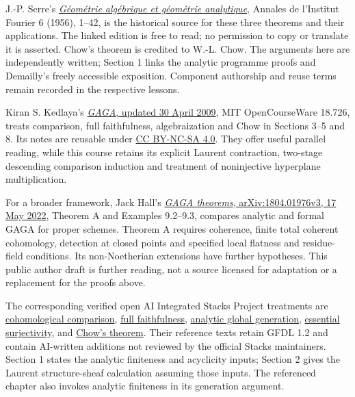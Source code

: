 \documentclass[11pt]{article}
\begin{document}
J.-P. Serre's
\href{https://www.numdam.org/item/AIF_1956__6__1_0/}{\emph{Géométrie
algébrique et géométrie analytique}}, Annales de l'Institut Fourier 6
(1956), 1--42, is the historical source for these three theorems and
their applications. The linked edition is free to read; no permission to
copy or translate it is asserted. Chow's theorem is credited to W.-L.
Chow. The arguments here are independently written; Section 1 links the
analytic programme proofs and Demailly's freely accessible exposition.
Component authorship and reuse terms remain recorded in the respective
lessons.

Kiran S. Kedlaya's
\href{https://ocw.mit.edu/courses/18-726-algebraic-geometry-spring-2009/resources/mit18_726s09_lec22_gaga/}{\emph{GAGA},
updated 30 April 2009}, MIT OpenCourseWare 18.726, treats comparison,
full faithfulness, algebraization and Chow in Sections 3--5 and 8. Its
notes are reusable under
\href{https://ocw.mit.edu/pages/privacy-and-terms-of-use/}{CC BY-NC-SA
4.0}. They offer useful parallel reading, while this course retains its
explicit Laurent contraction, two-stage descending comparison induction
and treatment of noninjective hyperplane multiplication.

For a broader framework, Jack Hall's
\href{https://arxiv.org/abs/1804.01976v3}{\emph{GAGA theorems},
arXiv:1804.01976v3, 17 May 2022}, Theorem A and Examples 9.2--9.3,
compares analytic and formal GAGA for proper schemes. Theorem A requires
coherence, finite total coherent cohomology, detection at closed points
and specified local flatness and residue-field conditions. Its
non-Noetherian extensions have further hypotheses. This public author
draft is further reading, not a source licensed for adaptation or a
replacement for the proofs above.

The corresponding verified open AI Integrated Stacks Project treatments
are
\href{https://kokunoyumeto.github.io/stacks-zh-hans-cn/en/gaga.html\#gaga-section-proof-gaga-cohomology}{cohomological
comparison},
\href{https://kokunoyumeto.github.io/stacks-zh-hans-cn/en/gaga.html\#gaga-section-proof-gaga-fully-faithful}{full
faithfulness},
\href{https://kokunoyumeto.github.io/stacks-zh-hans-cn/en/gaga.html\#gaga-lemma-projective-analytic-global-generation}{analytic
global generation},
\href{https://kokunoyumeto.github.io/stacks-zh-hans-cn/en/gaga.html\#gaga-section-completion-gaga-essential-surjectivity}{essential
surjectivity}, and
\href{https://kokunoyumeto.github.io/stacks-zh-hans-cn/en/gaga.html\#gaga-theorem-chow-closed-analytic-projective}{Chow's
theorem}. Their reference texts retain GFDL 1.2 and contain AI-written
additions not reviewed by the official Stacks maintainers. Section 1
states the analytic finiteness and acyclicity inputs; Section 2 gives
the Laurent structure-sheaf calculation assuming those inputs. The
referenced chapter also invokes analytic finiteness in its generation
argument.
\end{document}
